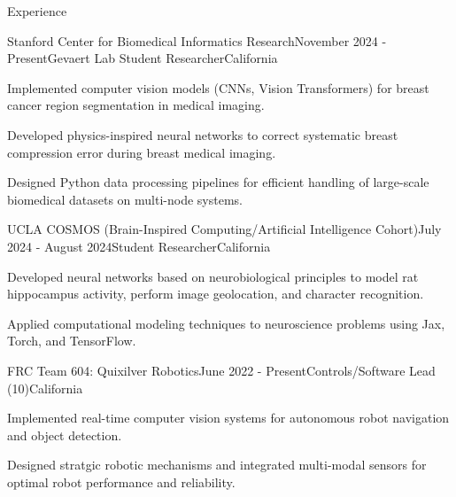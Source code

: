 \documentclass[
  10pt, %
]{resume}
\begin{document}
\sloppy


\begin{rSection}{Experience}


  \begin{rSubsection}{Stanford Center for Biomedical Informatics Research}{November 2024 - Present}{Gevaert Lab Student Researcher}{California}
    
    \item Implemented computer vision models (CNNs, Vision Transformers) for breast cancer region segmentation in medical imaging.
    
    \item Developed physics-inspired neural networks to correct systematic breast compression error during breast medical imaging.
    
    \item Designed Python data processing pipelines for efficient handling of large-scale biomedical datasets on multi-node systems.
    
  \end{rSubsection}
        
  \begin{rSubsection}{UCLA COSMOS (Brain-Inspired Computing/Artificial Intelligence Cohort)}{July 2024 - August 2024}{Student Researcher}{California}
    
    \item Developed neural networks based on neurobiological principles to model rat hippocampus activity, perform image geolocation, and character recognition.
    
    \item Applied computational modeling techniques to neuroscience problems using Jax, Torch, and TensorFlow.
    
  \end{rSubsection}
        
  \begin{rSubsection}{FRC Team 604: Quixilver Robotics}{June 2022 - Present}{Controls/Software Lead (10)}{California}
    
    \item Implemented real-time computer vision systems for autonomous robot navigation and object detection.
    
    \item Designed stratgic robotic mechanisms and integrated multi-modal sensors for optimal robot performance and reliability.
    

\end{rSubsection}
\end{rSection}
\end{document}
